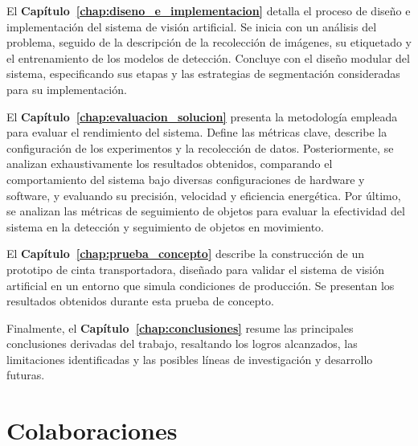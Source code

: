 \documentclass[11pt,spanish,listoffigures,listoftables]{tfgetsinf}
\begin{document}
El \textbf{Capítulo~\ref{chap:diseno_e_implementacion}} detalla el proceso de diseño e implementación del sistema de visión artificial. Se inicia con un análisis del problema, seguido de la descripción de la recolección de imágenes, su etiquetado y el entrenamiento de los modelos de detección. Concluye con el diseño modular del sistema, especificando sus etapas y las estrategias de segmentación consideradas para su implementación.

El \textbf{Capítulo~\ref{chap:evaluacion_solucion}} presenta la metodología empleada para evaluar el rendimiento del sistema. Define las métricas clave, describe la configuración de los experimentos y la recolección de datos. Posteriormente, se analizan exhaustivamente los resultados obtenidos, comparando el comportamiento del sistema bajo diversas configuraciones de hardware y software, y evaluando su precisión, velocidad y eficiencia energética. Por último, se analizan las métricas de seguimiento de objetos para evaluar la efectividad del sistema en la detección y seguimiento de objetos en movimiento.

El \textbf{Capítulo~\ref{chap:prueba_concepto}} describe la construcción de un prototipo de cinta transportadora, diseñado para validar el sistema de visión artificial en un entorno que simula condiciones de producción. Se presentan los resultados obtenidos durante esta prueba de concepto.

Finalmente, el \textbf{Capítulo~\ref{chap:conclusiones}} resume las principales conclusiones derivadas del trabajo, resaltando los logros alcanzados, las limitaciones identificadas y las posibles líneas de investigación y desarrollo futuras.




\section{Colaboraciones}
\end{document}
